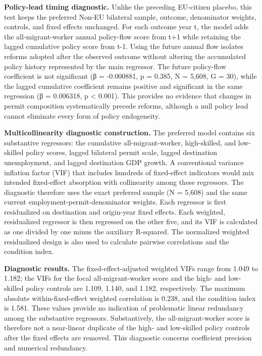 \documentclass[11pt,a4paper]{article}
\begin{document}
\textbf{Policy-lead timing diagnostic.} Unlike the preceding EU-citizen
placebo, this test keeps the preferred Non-EU bilateral sample, outcome,
denominator weights, controls, and fixed effects unchanged. For each
outcome year t, the model adds the all-migrant-worker annual policy-flow
score from t+1 while retaining the lagged cumulative policy score from
t-1. Using the future annual flow isolates reforms adopted after the
observed outcome without altering the accumulated policy history
represented by the main regressor. The future policy-flow coefficient is
not significant (β = -0.000881, p = 0.385, N = 5,608, G = 30), while the
lagged cumulative coefficient remains positive and significant in the
same regression (β = 0.006318, p \textless{} 0.001). This provides no
evidence that changes in permit composition systematically precede
reforms, although a null policy lead cannot eliminate every form of
policy endogeneity.

\textbf{Multicollinearity diagnostic construction.} The preferred model
contains six substantive regressors: the cumulative all-migrant-worker,
high-skilled, and low-skilled policy scores, lagged bilateral permit
scale, lagged destination unemployment, and lagged destination GDP
growth. A conventional variance inflation factor (VIF) that includes
hundreds of fixed-effect indicators would mix intended fixed-effect
absorption with collinearity among these regressors. The diagnostic
therefore uses the exact preferred sample (N = 5,608) and the same
current employment-permit-denominator weights. Each regressor is first
residualized on destination and origin-year fixed effects. Each
weighted, residualized regressor is then regressed on the other five,
and its VIF is calculated as one divided by one minus the auxiliary
R-squared. The normalized weighted residualized design is also used to
calculate pairwise correlations and the condition index.

\textbf{Diagnostic results.} The fixed-effect-adjusted weighted VIFs
range from 1.049 to 1.182; the VIFs for the focal all-migrant-worker
score and the high- and low-skilled policy controls are 1.109, 1.140,
and 1.182, respectively. The maximum absolute within-fixed-effect
weighted correlation is 0.238, and the condition index is 1.581. These
values provide no indication of problematic linear redundancy among the
substantive regressors. Substantively, the all-migrant-worker score is
therefore not a near-linear duplicate of the high- and low-skilled
policy controls after the fixed effects are removed. This diagnostic
concerns coefficient precision and numerical redundancy.
\end{document}
